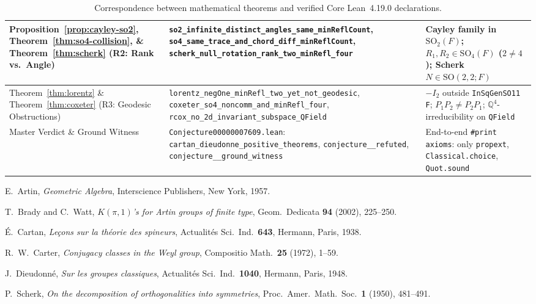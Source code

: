 \documentclass[11pt,a4paper]{article}
\theoremstyle{plain}
\theoremstyle{definition}
\newcommand{\Q}{\mathbb{Q}}
\newcommand{\SO}{\mathrm{SO}}
\begin{document}
\begin{table}[ht]
\begin{tabular}{>{\raggedright\arraybackslash}p{4.0cm}>{\raggedright\arraybackslash}p{5.7cm}>{\raggedright\arraybackslash}p{5.0cm}}
\hline
Proposition~\ref{prop:cayley-so2}, Theorem~\ref{thm:so4-collision}, \& Theorem~\ref{thm:scherk} (R2: Rank vs.\ Angle) &
\texttt{so2\_\allowbreak infinite\_\allowbreak distinct\_\allowbreak angles\_\allowbreak same\_\allowbreak minReflCount}, \texttt{so4\_\allowbreak same\_\allowbreak trace\_\allowbreak and\_\allowbreak chord\_\allowbreak diff\_\allowbreak minReflCount}, \texttt{scherk\_\allowbreak null\_\allowbreak rotation\_\allowbreak rank\_\allowbreak two\_\allowbreak minRefl\_\allowbreak four} &
Cayley family in $\SO_2(F)$; $R_1, R_2 \in \SO_4(F)$ ($2 \neq 4$); Scherk $N \in \SO(2,2; F)$ \\
\hline
Theorem~\ref{thm:lorentz} \& Theorem~\ref{thm:coxeter} (R3: Geodesic Obstructions) &
\texttt{lorentz\_\allowbreak negOne\_\allowbreak minRefl\_\allowbreak two\_\allowbreak yet\_\allowbreak not\_\allowbreak geodesic}, \texttt{coxeter\_\allowbreak so4\_\allowbreak noncomm\_\allowbreak and\_\allowbreak minRefl\_\allowbreak four}, \texttt{rcox\_\allowbreak no\_\allowbreak 2d\_\allowbreak invariant\_\allowbreak subspace\_\allowbreak QField} &
$-I_2$ outside \texttt{InSqGenSO11 F}; $P_1 P_2 \neq P_2 P_1$; $\Q^4$-irreducibility on \texttt{QField} \\
\hline
Master Verdict \& Ground Witness &
\texttt{Conjecture00000007609.lean}: \texttt{cartan\_\allowbreak dieudonne\_\allowbreak positive\_\allowbreak theorems}, \texttt{conjecture\_\allowbreak 00000007609\_\allowbreak refuted}, \texttt{conjecture\_\allowbreak 00000007609\_\allowbreak ground\_\allowbreak witness} &
End-to-end \texttt{\#print axioms}: only \texttt{propext}, \texttt{Classical.choice}, \texttt{Quot.sound} \\
\hline
\end{tabular}
\caption{Correspondence between mathematical theorems and verified Core Lean~4.19.0 declarations.}
\label{tab:lean-map}
\end{table}

\clearpage
\begin{thebibliography}{9}

E.~Artin, \emph{Geometric Algebra}, Interscience Publishers, New York, 1957.

T.~Brady and C.~Watt, \emph{$K(\pi, 1)$'s for Artin groups of finite type}, Geom.\ Dedicata \textbf{94} (2002), 225--250.

\'E.~Cartan, \emph{Le\c{c}ons sur la th\'eorie des spineurs}, Actualit\'es Sci.\ Ind.\ \textbf{643}, Hermann, Paris, 1938.

R.~W.~Carter, \emph{Conjugacy classes in the Weyl group}, Compositio Math.\ \textbf{25} (1972), 1--59.

J.~Dieudonn\'e, \emph{Sur les groupes classiques}, Actualit\'es Sci.\ Ind.\ \textbf{1040}, Hermann, Paris, 1948.

P.~Scherk, \emph{On the decomposition of orthogonalities into symmetries}, Proc.\ Amer.\ Math.\ Soc.\ \textbf{1} (1950), 481--491.

\end{thebibliography}
\end{document}
